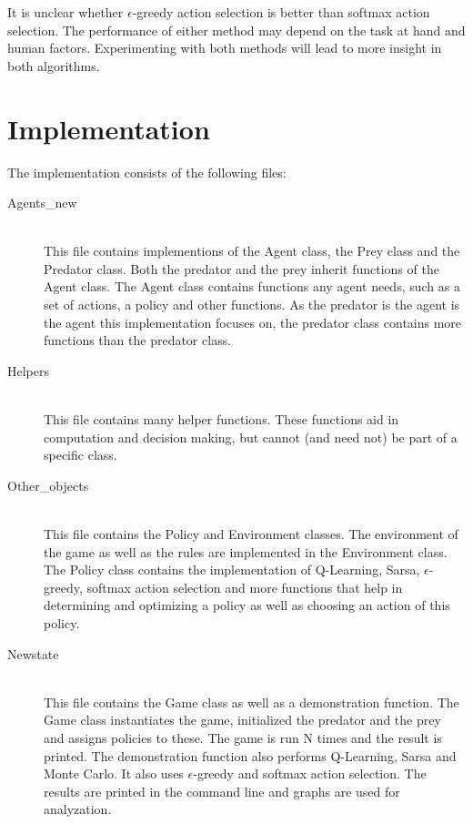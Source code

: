 \documentclass{article}
\begin{document}
It is unclear whether $\epsilon$-greedy action selection is better than softmax action selection. The performance of either method may depend on the task at hand and human factors. Experimenting with both methods will lead to more insight in both algorithms.
\pagebreak

\section*{Implementation}
The implementation consists of the following files:
\begin{description}
	\item[Agents\_new] \hfill \\ 
	This file contains implementions of the Agent class, the Prey class and the Predator class. Both the predator and the prey inherit functions of the Agent class. The Agent class contains functions any agent needs, such as a set of actions, a policy and other functions. As the predator is the agent is the agent this implementation focuses on, the predator class contains more functions than the predator class.
	
	\item[Helpers] \hfill \\ 
	This file contains many helper functions. These functions aid in computation and decision making, but cannot (and need not) be part of a specific class.
	
	\item[Other\_objects] \hfill \\ %
	This file contains the Policy and Environment classes. The environment of the game as well as the rules are implemented in the Environment class. The Policy class contains the implementation of Q-Learning, Sarsa, $\epsilon$-greedy, softmax action selection and more functions that help in determining and optimizing a policy as well as choosing an action of this policy.
	\item[Newstate] \hfill \\ 
	This file contains the Game class as well as a demonstration function. The Game class instantiates the game, initialized the predator and the prey and assigns policies to these. The game is run N times and the result is printed. The demonstration function also performs Q-Learning, Sarsa and Monte Carlo. It also uses $\epsilon$-greedy and softmax action selection. The results are printed in the command line and graphs are used for analyzation.
\end{description}
\end{document}
